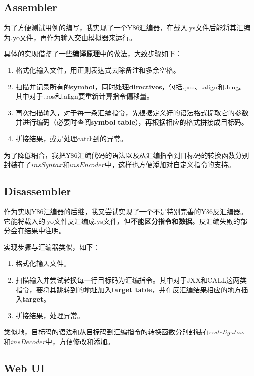 \subsection{Assembler}

为了方便测试用例的编写，我实现了一个Y86汇编器，在载入.ys文件后能将其汇编为.yo文件，再作为输入交由模拟器来运行。

具体的实现借鉴了一些{\bf 编译原理}中的做法，大致步骤如下：

\begin{enumerate}
\item 格式化输入文件，用正则表达式去除备注和多余空格。
\item 扫描并记录所有的{\bf symbol}，同时处理{\bf directives}，包括.pos、.align和.long。其中对于.pos和.align要重新计算指令偏移量。
\item 再次扫描输入，对于每一条汇编指令，先根据定义好的语法格式提取它的参数并进行编码（必要时查阅{\bf symbol table}），再根据相应的格式拼接成目标码。
\item 拼接结果，或是处理catch到的异常。
\end{enumerate}

为了降低耦合，我把Y86汇编代码的语法以及从汇编指令到目标码的转换函数分别封装在了$insSyntax$和$insEncoder$中，这样也方便添加对自定义指令的支持。

\subsection{Disassembler}

作为实现Y86汇编器的后继，我又尝试实现了一个不是特别完善的Y86反汇编器。它能将载入的.yo文件反汇编成.ys文件，但{\bf 不能区分指令和数据}。反汇编失败的部分会在结果中注明。

实现步骤与汇编器类似，如下：

\begin{enumerate}
\item 格式化输入文件。
\item 扫描输入并尝试转换每一行目标码为汇编指令。其中对于JXX和CALL这两类指令，要将其跳转到的地址加入{\bf target table}，并在反汇编结果相应的地方插入{\bf target}。
\item 拼接结果，处理异常。
\end{enumerate}

类似地，目标码的语法和从目标码到汇编指令的转换函数分别封装在$codeSyntax$和$insDecoder$中，方便修改和添加。

\subsection{Web UI}


